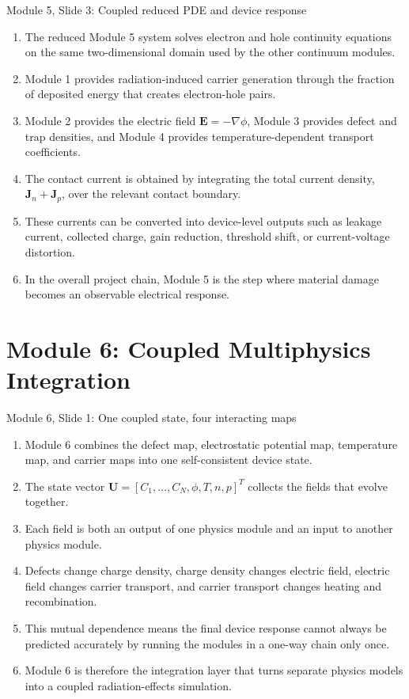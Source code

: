 \documentclass[11pt]{article}
\newcommand{\Evec}{\bm{E}}
\newcommand{\Jn}{\bm{J}_n}
\newcommand{\Jp}{\bm{J}_p}
\begin{document}
\begin{slidebox}{Module 5, Slide 3: Coupled reduced PDE and device response}
\begin{enumerate}
\item The reduced Module 5 system solves electron and hole continuity equations on the same two-dimensional domain used by the other continuum modules.
\item Module 1 provides radiation-induced carrier generation through the fraction of deposited energy that creates electron-hole pairs.
\item Module 2 provides the electric field \(\Evec=-\nabla\phi\), Module 3 provides defect and trap densities, and Module 4 provides temperature-dependent transport coefficients.
\item The contact current is obtained by integrating the total current density, \(\Jn+\Jp\), over the relevant contact boundary.
\item These currents can be converted into device-level outputs such as leakage current, collected charge, gain reduction, threshold shift, or current-voltage distortion.
\item In the overall project chain, Module 5 is the step where material damage becomes an observable electrical response.
\end{enumerate}
\end{slidebox}

\section{Module 6: Coupled Multiphysics Integration}

\begin{slidebox}{Module 6, Slide 1: One coupled state, four interacting maps}
\begin{enumerate}
\item Module 6 combines the defect map, electrostatic potential map, temperature map, and carrier maps into one self-consistent device state.
\item The state vector \(\bm U=[C_1,\ldots,C_N,\phi,T,n,p]^T\) collects the fields that evolve together.
\item Each field is both an output of one physics module and an input to another physics module.
\item Defects change charge density, charge density changes electric field, electric field changes carrier transport, and carrier transport changes heating and recombination.
\item This mutual dependence means the final device response cannot always be predicted accurately by running the modules in a one-way chain only once.
\item Module 6 is therefore the integration layer that turns separate physics models into a coupled radiation-effects simulation.
\end{enumerate}
\end{slidebox}
\end{document}
